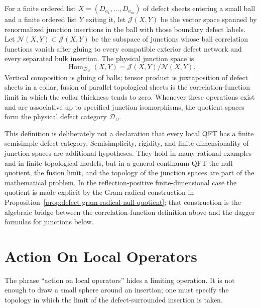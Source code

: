 \begin{definition}
\label{def:physical-defect-category-null-quotient}
For a finite ordered list \(X=(D_{a_1},\ldots,D_{a_m})\) of defect sheets
entering a small ball and a finite ordered list \(Y\) exiting it, let
\(\mathcal J(X,Y)\) be the vector space spanned by renormalized junction
insertions in the ball with those boundary defect labels.  Let
\(\mathcal N(X,Y)\subset\mathcal J(X,Y)\) be the subspace of junctions whose
ball correlation functions vanish after gluing to every compatible exterior
defect network and every separated bulk insertion.  The physical junction
space is
\begin{equation}
  \operatorname{Hom}_{\mathcal D_{\mathcal Q}}(X,Y)
  =
  \mathcal J(X,Y)/\mathcal N(X,Y).
  \label{eq:defect-hom-null-quotient}
\end{equation}
Vertical composition is gluing of balls; tensor product is juxtaposition of
defect sheets in a collar; fusion of parallel topological sheets is the
correlation-function limit in which the collar thickness tends to zero.
Whenever these operations exist and are associative up to specified junction
isomorphisms, the quotient spaces form the physical defect category
\(\mathcal D_{\mathcal Q}\).
\end{definition}

This definition is deliberately not a declaration that every local QFT has a
finite semisimple defect category.  Semisimplicity, rigidity, and
finite-dimensionality of junction spaces are additional hypotheses.  They
hold in many rational examples and in finite topological models, but in a
general continuum QFT the null quotient, the fusion limit, and the topology
of the junction spaces are part of the mathematical problem.  In the
reflection-positive finite-dimensional case the quotient is made explicit by
the Gram-radical construction in
Proposition~\ref{prop:defect-gram-radical-null-quotient}; that construction
is the algebraic bridge between the correlation-function definition above and
the dagger formulas for junctions below.

\section{Action On Local Operators}

The phrase ``action on local operators'' hides a limiting operation.  It is
not enough to draw a small sphere around an insertion; one must specify the
topology in which the limit of the defect-surrounded insertion is taken.

